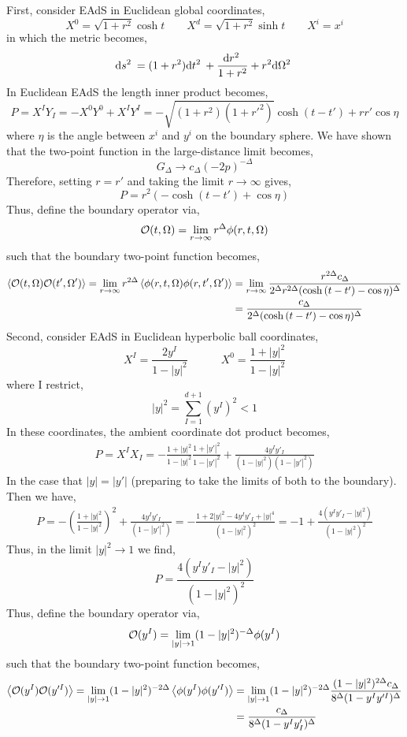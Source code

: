\documentclass[12pt]{article}
\begin{document}
First, consider EAdS in Euclidean global coordinates,
\[ X^0 = \sqrt{1 + r^2} \cosh{t} \quad \quad X^d = \sqrt{1 + r^2} \sinh{t} \quad \quad X^i = x^i \]
in which the metric becomes,
\[ \mathrm{d}s^2 \: = (1 + r^2) \mathrm{d}t^2 \: + \frac{\mathrm{d}r^2 \:}{1 + r^2} + r^2 \mathrm{d}\Omega^2 \: \]
In Euclidean EAdS the length inner product becomes,
\[ P = X^I Y_I = - X^0 Y^0 + X^I Y^I = -\sqrt{(1 + r^2)(1 + r'^2)}  \cosh{(t - t')} + r r' \cos{\eta} \]
where $\eta$ is the angle between $x^i$ and $y^i$ on the boundary sphere.  
We have shown that the two-point function in the large-distance limit becomes,
\[ G_\Delta \to c_\Delta (-2 p)^{-\Delta} \]
Therefore, setting $r = r'$ and taking the limit $r \to \infty$ gives,
\[ P = r^2 \left( -\cosh{(t - t')} + \cos{\eta} \right) \]
Thus, define the boundary operator via,
\begin{align*}
\mathcal{O}(t, \Omega) = \lim_{r \to \infty} r^{\Delta} \phi(r, t, \Omega)
\end{align*}
such that the boundary two-point function becomes,
\begin{align*}
\left< \mathcal{O}(t, \Omega) \mathcal{O}(t', \Omega') \right> = \lim_{r \to \infty} r^{2\Delta} \left<  \phi(r, t, \Omega) \phi(r, t', \Omega') \right> & = \lim_{r \to \infty} \frac{r^{2\Delta} c_\Delta}{2^{\Delta} r^{2 \Delta} (\cosh{(t - t')} - \cos{\eta})^{\Delta}}
\\
& = \frac{c_\Delta}{2^\Delta (\cosh{(t - t')} - \cos{\eta})^{\Delta}} 
\end{align*}
Second, consider EAdS in Euclidean hyperbolic ball coordinates,
\[ X^I = \frac{2y^I}{1 - |y|^2} \quad \quad \quad X^0 = \frac{1 + |y|^2}{1 - |y|^2}  \]
where I restrict,
\[ |y|^2 = \sum_{I = 1}^{d + 1} (y^I)^2 < 1 \]
In these coordinates, the ambient coordinate dot product becomes,
\begin{align*}
P = X^I X_I = -\frac{1 + |y|^2}{1 - |y|^2} \frac{1 + |y'|^2}{1 - |y'|^2}  + \frac{4 y^I y'_I}{(1 - |y|^2) (1 - |y'|^2)} 
\end{align*}
In the case that $|y| = |y'|$ (preparing to take the limits of both to the boundary). Then we have,
\begin{align*}
P = - \left( \frac{1 + |y|^2}{1 - |y|^2} \right)^2 + \frac{4 y^I y'_I}{(1 - |y'|^2)} = - \frac{1 +  2|y|^2 - 4 y^I y'_I + |y|^4}{(1 - |y|^2)^2} = - 1 + \frac{4 (y^I y'_I - |y|^2)}{(1 - |y|^2)^2}
\end{align*}
Thus, in the limit $|y|^2 \to 1$ we find,
\[ P = \frac{4 (y^I y'_I - |y|^2)}{(1 - |y|^2)^2} \]
Thus, define the boundary operator via,
\begin{align*}
\mathcal{O}(y^I) = \lim_{|y| \to 1} (1 - |y|^2)^{-\Delta} \phi(y^I)
\end{align*}
such that the boundary two-point function becomes,
\begin{align*}
\left< \mathcal{O}(y^I) \mathcal{O}(y'^I) \right> = \lim_{|y| \to 1} (1 - |y|^2)^{-2 \Delta} \left<  \phi(y^I) \phi(y'^I) \right> & = \lim_{|y| \to 1} (1 - |y|^2)^{-2 \Delta} \frac{(1 - |y|^2)^{2 \Delta} c_\Delta}{8^{\Delta} (1 - y^I y'^I)^{\Delta}}
\\
& = \frac{c_\Delta}{8^\Delta (1 - y^I y'_I)^{\Delta}}
\end{align*}
\end{document}
